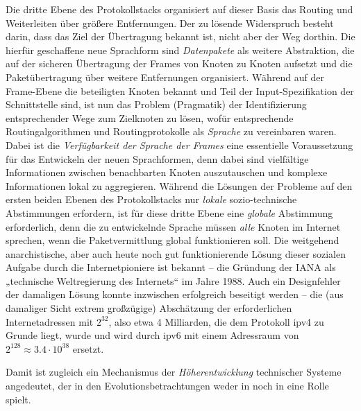 \documentclass[11pt,a4paper]{article}
\begin{document}
Die dritte Ebene des Protokollstacks organisiert auf dieser Basis das Routing
und Weiterleiten über größere Entfernungen.  Der zu lösende Widerspruch
besteht darin, dass das Ziel der Übertragung bekannt ist, nicht aber der Weg
dorthin.  Die hierfür geschaffene neue Sprachform sind \emph{Datenpakete} als
weitere Abstraktion, die auf der sicheren Übertragung der Frames von Knoten zu
Knoten aufsetzt und die Paketübertragung über weitere Entfernungen
organisiert.  Während auf der Frame-Ebene die beteiligten Knoten bekannt und
Teil der Input-Spezifikation der Schnittstelle sind, ist nun das Problem
(Pragmatik) der Identifizierung entsprechender Wege zum Zielknoten zu lösen,
wofür entsprechende Routingalgorithmen und Routingprotokolle als
\emph{Sprache} zu vereinbaren waren.  Dabei ist die \emph{Verfügbarkeit der
  Sprache der Frames} eine essentielle Voraussetzung für das Entwickeln der
neuen Sprachformen, denn dabei sind vielfältige Informationen zwischen
benachbarten Knoten auszutauschen und komplexe Informationen lokal zu
aggregieren.  Während die Lösungen der Probleme auf den ersten beiden Ebenen
des Protokollstacks nur \emph{lokale} sozio-technische Abstimmungen erfordern,
ist für diese dritte Ebene eine \emph{globale} Abstimmung erforderlich, denn
die zu entwickelnde Sprache müssen \emph{alle} Knoten im Internet sprechen,
wenn die Paketvermittlung global funktionieren soll. Die weitgehend
anarchistische, aber auch heute noch gut funktionierende Lösung dieser
sozialen Aufgabe durch die Internetpioniere ist bekannt -- die Gründung der
IANA als „technische Weltregierung des Internets“ im Jahre 1988.  Auch ein
Designfehler der damaligen Lösung konnte inzwischen erfolgreich beseitigt
werden -- die (aus damaliger Sicht extrem großzügige) Abschätzung der
erforderlichen Internetadressen mit $2^{32}$, also etwa 4 Milliarden, die dem
Protokoll ipv4 zu Grunde liegt, wurde und wird durch ipv6 mit einem Adressraum
von $2^{128}\approx 3.4\cdot 10^{38}$ ersetzt.

Damit ist zugleich ein Mechanismus der \emph{Höherentwicklung} technischer
Systeme angedeutet, der in den Evolutionsbetrachtungen weder in
\cite{TESE2018} noch in \cite{Shpakovsky2010} eine Rolle spielt.
\end{document}
